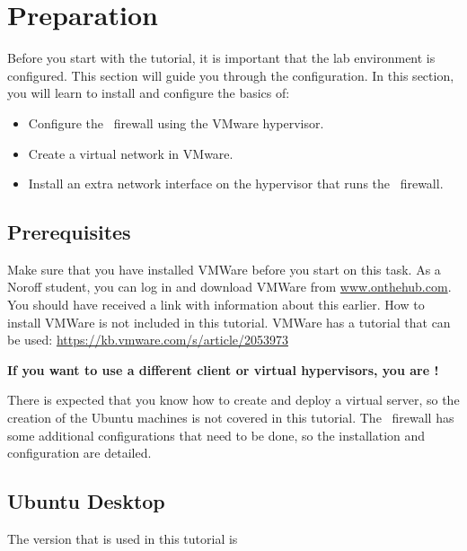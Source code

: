 \newpage

\section{Preparation} \label{preparation}
Before you start with the tutorial, it is important that the lab environment is configured. This section will guide you through the configuration. In this section, you will learn to install and configure the basics of:

\begin{itemize}
    \item Configure the \opnsense\ firewall using the VMware hypervisor.
    \item Create a virtual network in VMware.
    \item Install an extra network interface on the hypervisor that runs the \opnsense\ firewall.
\end{itemize}


\subsection*{Prerequisites}
Make sure that you have installed VMWare before you start on this task. As a Noroff student, you can log in and download VMWare from \url{www.onthehub.com}. You should have received a link with information about this earlier. How to install VMWare is not included in this tutorial. VMWare has a tutorial that can be used: \url{https://kb.vmware.com/s/article/2053973}

\begin{importantblock}
\textbf{If you want to use a different client or virtual hypervisors, you are !}
\end{importantblock}

There is expected that you know how to create and deploy a virtual server, so the creation of the Ubuntu machines is not covered in this tutorial. The \opnsense\ firewall has some additional configurations that need to be done, so the installation and configuration are detailed.

\subsection{Ubuntu Desktop}
 The version that is used in this tutorial is 

